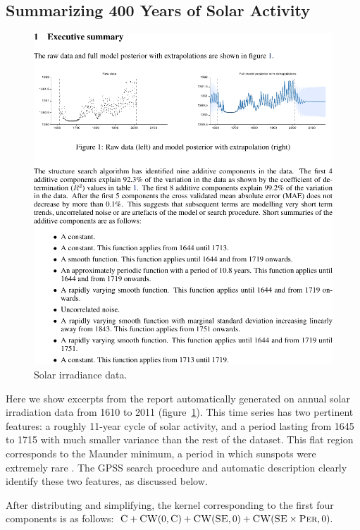 \documentclass{article}
\let\emptyset 0
\begin{document}
\subsection{Summarizing 400 Years of Solar Activity}
\label{sec:solar}

\begin{figure}[h]
\centering
\includegraphics[trim=0.5cm 11.0cm 9cm 1.7cm, clip, width=0.98\columnwidth, height=0.55\columnwidth]{solarpages/02-solar-seperate-pages-2}
\caption{
Solar irradiance data.}
\label{fig:solar}
\end{figure}

Here we show excerpts from the report automatically generated on annual solar irradiation data from 1610 to 2011 (figure~\ref{fig:solar}).
This time series has two pertinent features: a roughly 11-year cycle of solar activity, and a period lasting from 1645 to 1715 with much smaller variance than the rest of the dataset.  This flat region corresponds to the Maunder minimum, a period in which sunspots were extremely rare \citep{lean1995reconstruction}.
The GPSS search procedure and automatic description clearly identify these two features, as discussed below.

After distributing and simplifying, the kernel corresponding to the first four components is as follows:
$\kC + \kCW(\emptyset,\kC) + \kCW(\kSE,\emptyset) + \kCW(\kSE \times \kPer,\emptyset).$
\end{document}
